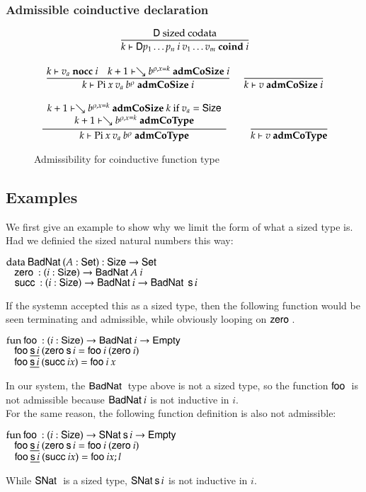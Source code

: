 \subsubsection{Admissible coinductive declaration}

\begin{figure}[p]
\begin{gather*}
\ \dfrac{\mathsf{D} \mbox{ sized codata}}{k\vdash\mathsf{D} p_1 \ldots p_n \: i \: v_1 \ldots v_m\mbox{ \textbf{coind} }i}
\\[2ex]
\ \dfrac{k\vdash v_a\mbox{ \textbf{nocc} }i
\quad
k+1\vdash\searrow b^{\rho,x=k}\mbox{ \textbf{admCoSize} }i}{k\vdash\mathrm{Pi} \: x \: v_a \: b^{\rho}\mbox{ \textbf{admCoSize} }i}
\quad
\ \dfrac{}{k\vdash v\mbox{ \textbf{admCoSize} }i}
\\[2ex]
\ \dfrac{\begin{array}[b]{c}k+1\vdash\searrow b^{\rho,x=k}\mbox{ \textbf{admCoSize} }k \mbox{ if } v_a = \mathsf{Size}\\k+1\vdash\searrow b^{\rho,x=k}\mbox{ \textbf{admCoType}}\end{array}}{k\vdash\mathrm{Pi} \: x \: v_a \: b^{\rho}\mbox{ \textbf{admCoType}}}
\qquad
\ \dfrac{}{k\vdash v\mbox{ \textbf{admCoType}}}
\end{gather*}
\caption{Admissibility for coinductive function type}
\end{figure}

\subsection{Examples}
We first give an example to show why we limit the form of what a sized type is.
Had we definied the sized natural numbers this way:
\begin{bsp}
$\mathrm{data}\: \mathsf{BadNat}\: ( A : \mathsf{Set} ) : \mathsf{Size} \rightarrow \mathsf{Set} $ \\
$\hspace*{3mm} \mathsf{zero}\: : ( i : \mathsf{Size} ) \rightarrow{ \mathsf{BadNat}\:A \: i} $\\
$\hspace*{3mm} \mathsf{succ}\: : ( i : \mathsf{Size} ) \rightarrow{\mathsf{BadNat}\:i \rightarrow\mathsf{BadNat}\:\: \mathsf{s}\,i} $
\end{bsp}
If the systemn accepted this as a sized type, then the following function would be seen terminating and admissible, while obviously looping on $\mathsf{zero}\:$.
\begin{bsp}
$\mathrm{fun}\: \mathsf{foo}\: : ( i : \mathsf{Size} ) \rightarrow{\mathsf{BadNat}\:i \rightarrow\mathsf{Empty}\:}$\\
$\hspace*{3mm} \mathsf{foo}\: \underline{\mathsf{s}\, i} \: (\mathsf{zero}\: \mathsf{s}\, i = \mathsf{foo}\: i \: (\mathsf{zero}\: i)$\\
$\hspace*{3mm} \mathsf{foo}\: \underline{\mathsf{s}\, i}\: (\mathsf{succ}\: i x) = \mathsf{foo}\: i \: x$
\end{bsp}
In our system, the $\mathsf{BadNat}\:$ type above is not a sized type, so the function $\mathsf{foo}\:$ is not admissible because $\mathsf{BadNat}\: i$ is not inductive in $i$.\\
For the same reason, the following function definition is also not admissible:
\begin{bsp}
$\mathrm{fun}\: \mathsf{foo}\: : ( i : \mathsf{Size} ) \rightarrow{\mathsf{SNat}\:\mathsf{s}\,i \rightarrow\mathsf{Empty}\:}$\\
$\hspace*{3mm} \mathsf{foo}\: \underline{\mathsf{s}\, i} \: (\mathsf{zero}\: \mathsf{s}\, i = \mathsf{foo}\: i \: (\mathsf{zero}\: i)$\\
$\hspace*{3mm} \mathsf{foo}\: \underline{\mathsf{s}\, i}\: (\mathsf{succ}\: i x) = \mathsf{foo}\: i x; l$
\end{bsp}
While $\mathsf{SNat}\:$ is a sized type, $\mathsf{SNat}\: \mathsf{s}\, i$ is not inductive in $i$.

